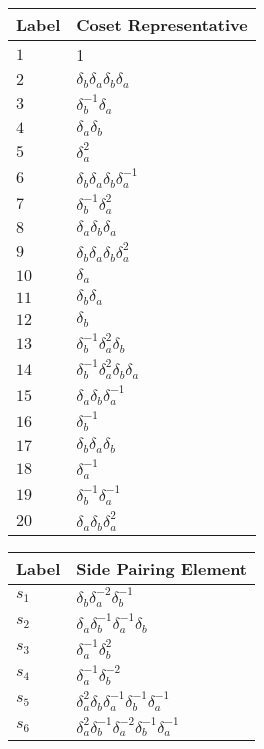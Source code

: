 \documentclass{article}
\begin{document}
\begin{center}
\begin{tabular}{ll}
\toprule
Label & Coset Representative\\
\midrule
$1$ & 1 \\
$2$ & $\delta_b^{}\delta_a^{}\delta_b^{}\delta_a^{}$ \\
$3$ & $\delta_b^{-1}\delta_a^{}$ \\
$4$ & $\delta_a^{}\delta_b^{}$ \\
$5$ & $\delta_a^{2}$ \\
$6$ & $\delta_b^{}\delta_a^{}\delta_b^{}\delta_a^{-1}$ \\
$7$ & $\delta_b^{-1}\delta_a^{2}$ \\
$8$ & $\delta_a^{}\delta_b^{}\delta_a^{}$ \\
$9$ & $\delta_b^{}\delta_a^{}\delta_b^{}\delta_a^{2}$ \\
$10$ & $\delta_a^{}$ \\
$11$ & $\delta_b^{}\delta_a^{}$ \\
$12$ & $\delta_b^{}$ \\
$13$ & $\delta_b^{-1}\delta_a^{2}\delta_b^{}$ \\
$14$ & $\delta_b^{-1}\delta_a^{2}\delta_b^{}\delta_a^{}$ \\
$15$ & $\delta_a^{}\delta_b^{}\delta_a^{-1}$ \\
$16$ & $\delta_b^{-1}$ \\
$17$ & $\delta_b^{}\delta_a^{}\delta_b^{}$ \\
$18$ & $\delta_a^{-1}$ \\
$19$ & $\delta_b^{-1}\delta_a^{-1}$ \\
$20$ & $\delta_a^{}\delta_b^{}\delta_a^{2}$ \\
\bottomrule
\end{tabular}
\hfill
\begin{tabular}{ll}
\toprule
Label & Side Pairing Element\\
\midrule
$s_{1}$ & $\delta_b^{}\delta_a^{-2}\delta_b^{-1}$ \\
$s_{2}$ & $\delta_a^{}\delta_b^{-1}\delta_a^{-1}\delta_b^{}$ \\
$s_{3}$ & $\delta_a^{-1}\delta_b^{2}$ \\
$s_{4}$ & $\delta_a^{-1}\delta_b^{-2}$ \\
$s_{5}$ & $\delta_a^{2}\delta_b^{}\delta_a^{-1}\delta_b^{-1}\delta_a^{-1}$ \\
$s_{6}$ & $\delta_a^{2}\delta_b^{-1}\delta_a^{-2}\delta_b^{-1}\delta_a^{-1}$ \\

\end{tabular}
\end{center}
\end{document}
